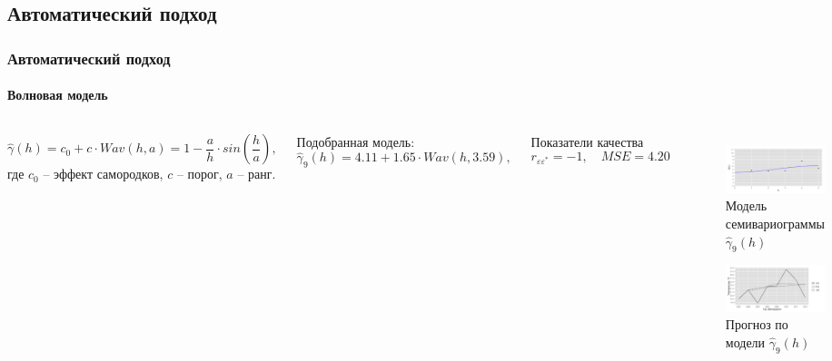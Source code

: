\documentclass[10pt,pdf,aspectratio=169,hyperref={unicode}]{beamer}
\begin{document}
\subsection{Автоматический подход}

\begin{frame}
  \frametitle{Автоматический подход}
  \framesubtitle{Волновая модель}
  \begin{columns}[c]
  \column{3in}
  \begin{equation}
  \label{eq:wave}
    \widehat{\gamma}(h) = c_0 + c \cdot Wav(h, a) = 1 - \frac{a}{h} \cdot sin(\frac{h}{a}),
  \end{equation}
  где $ c_0 $ -- эффект самородков, $ c $ -- порог, $ a $ -- ранг.

  \vspace{0.5em}

  Подобранная модель:
  \begin{equation}
  \label{eq:gamma9}
    \widehat{\gamma}_9(h) = 4.11 + 1.65 \cdot Wav(h, 3.59),
  \end{equation}

  Показатели качества
  \begin{equation*}
    r_{\varepsilon\varepsilon^{*}} = -1, \quad MSE = 4.20
  \end{equation*}

  \column{3in}
  \vspace{-14.5pt}
  \begin{figure}[H]
    \includegraphics[width=0.9\linewidth]{../../figures/variogram/auto-rob-5-modeled.png} \\
    \caption{Модель семивариограммы $\widehat{\gamma}_9(h)$}
    \includegraphics[width=0.9\linewidth]{../../figures/variogram/auto-rob-5-cross-prediction.png}
    \caption{Прогноз по модели $\widehat{\gamma}_9(h)$}
  \end{figure}
  \end{columns}
\end{frame}
\end{document}
